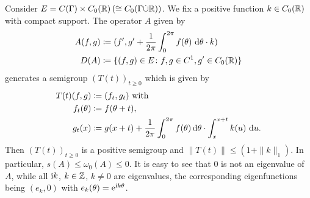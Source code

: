 \begin{example}\label{ex:b3-2.13}
%
	Consider $E = C(\Gamma) \times C_{0}(\mathbb{R}) \, (\cong C_{0}(\Gamma\dot{\cup}\mathbb{R}))$.
	We fix a positive function $k \in C_{0}(\mathbb{R})$ with compact support.
	The operator $A$ given by
	\begin{equation}\label{eq:b3-2.20}
		\begin{aligned}
		A(f,g) &\coloneqq (f',g' + \frac{1}{2\pi}\int_{0}^{2\pi} f(\theta) \, \mathop{}\!\mathrm{d}{\theta}\cdot k) \\
		D(A) &\coloneqq \{(f,g) \in E \colon f,g \in C^{1}, g' \in C_{0}(\mathbb{R})\}
		\end{aligned}
	\end{equation}
	generates a semigroup $(T(t))_{t \geq 0}$ which is given by
	\begin{equation}\label{eq:b3-2.21}
		\begin{aligned}
			T(t)(f,g) &\coloneq (f_{t},g_{t}) \text{ with }\\
		   f_{t}(\theta) &\coloneqq f(\theta+t), \\
			g_{t}(x) &\coloneqq g(x+t) + \frac{1}{2\pi}\int_{0}^{2\pi} f(\theta) \mathop{}\!\mathrm{d}{\theta}\cdot\int_{x}^{x+t} k(u) \, \mathop{}\!\mathrm{d}{u} .
		\end{aligned} 
	\end{equation}
	Then $(T(t))_{t \geq 0}$ is a positive semigroup and $\|T(t)\| \leq (1 + \|k\|_{1})$.
	In particular, $s(A) \leq \omega_{0}(A) \leq 0$.
	It is easy to see that $0$ is not an eigenvalue of $A$, while all $\mathrm{i} k$, $k \in \mathbb{Z}$, $k \neq 0$ are eigenvalues, the corresponding eigenfunctions being $(e_{k},0)$ with $e_{k}(\theta) = \mathrm{e}^{\mathrm{i} k\theta}$.
\end{example}
